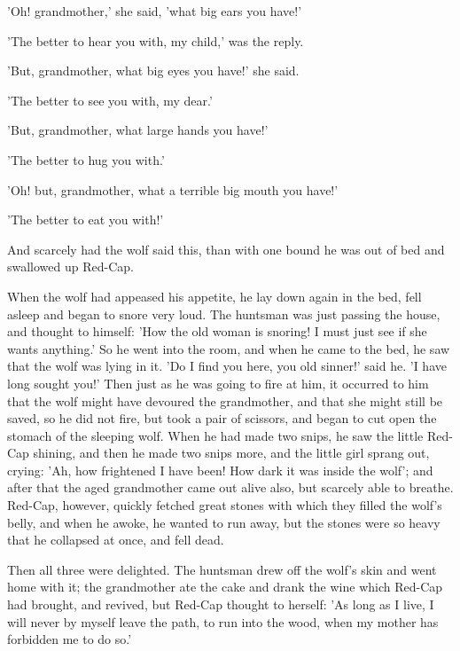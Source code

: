 \documentclass[12pt]{book}
\begin{document}
'Oh! grandmother,' she said, 'what big ears you have!'

'The better to hear you with, my child,' was the reply.

'But, grandmother, what big eyes you have!' she said.

'The better to see you with, my dear.'

'But, grandmother, what large hands you have!'

'The better to hug you with.'

'Oh! but, grandmother, what a terrible big mouth you have!'

'The better to eat you with!'

And scarcely had the wolf said this, than with one bound he was out of
bed and swallowed up Red-Cap.

When the wolf had appeased his appetite, he lay down again in the bed,
fell asleep and began to snore very loud. The huntsman was just
passing the house, and thought to himself: 'How the old woman is
snoring! I must just see if she wants anything.' So he went into the
room, and when he came to the bed, he saw that the wolf was lying in
it. 'Do I find you here, you old sinner!' said he. 'I have long sought
you!' Then just as he was going to fire at him, it occurred to him
that the wolf might have devoured the grandmother, and that she might
still be saved, so he did not fire, but took a pair of scissors, and
began to cut open the stomach of the sleeping wolf. When he had made
two snips, he saw the little Red-Cap shining, and then he made two
snips more, and the little girl sprang out, crying: 'Ah, how
frightened I have been! How dark it was inside the wolf'; and after
that the aged grandmother came out alive also, but scarcely able to
breathe. Red-Cap, however, quickly fetched great stones with which
they filled the wolf's belly, and when he awoke, he wanted to run
away, but the stones were so heavy that he collapsed at once, and fell
dead.

Then all three were delighted. The huntsman drew off the wolf's skin
and went home with it; the grandmother ate the cake and drank the wine
which Red-Cap had brought, and revived, but Red-Cap thought to
herself: 'As long as I live, I will never by myself leave the path, to
run into the wood, when my mother has forbidden me to do so.'
\end{document}
